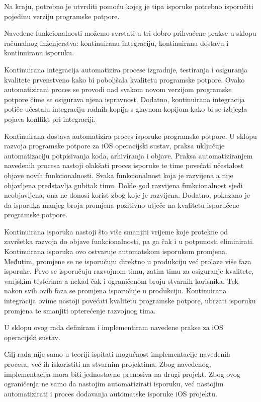 \documentclass[times, utf8, diplomski, numeric]{fer}
\begin{document}
Na kraju, potrebno je utvrditi pomoću kojeg je tipa isporuke potrebno isporučiti pojedinu verziju programske potpore.

Navedene funkcionalnosti možemo svrstati u tri dobro prihvaćene prakse u sklopu računalnog inženjerstva: kontinuiranu integraciju, kontinuiranu dostavu i kontinuiranu isporuku.

Kontinuirana integracija automatizira procese izgradnje, testiranja i osiguranja kvalitete prvenstveno kako bi poboljšala kvalitetu programske potpore. Ovako automatizirani proces se provodi nad svakom novom verzijom programske potpore čime se osigurava njena ispravnost. Dodatno, kontinuirana integracija potiče učestalu integraciju radnih kopija s glavnom kopijom kako bi se izbjegla pojava konflikt pri integraciji.

Kontinuirana dostava automatizira proces isporuke programske potpore. U sklopu razvoja programske potpore za iOS operacijski sustav, praksa uključuje automatizaciju potpisivanja koda, arhiviranja i objave. Praksa automatiziranjem navedenih procesa nastoji olakšati proces isporuke te time povećati učestalost objave novih funkcionalnosti. Svaka funkcionalnost koja je razvijena a nije objavljena predstavlja gubitak timu. Dokle god razvijena funkcionalnost sjedi neobjavljena, ona ne donosi korist zbog koje je razvijena. Dodatno, pokazano je da isporuka manjeg broja promjena pozitivno utječe na kvalitetu isporučene programske potpore.

Kontinuirana isporuka nastoji što više smanjiti vrijeme koje protekne od završetka razvoja do objave funkcionalnosti, pa ga čak i u potpunosti eliminirati. Kontinuirana isporuka ovo ostvaruje automatskom isporukom promjena. Međutim, promjene se ne isporučuju direktno u produkciju već prolaze više faza isporuke. Prvo se isporučuju razvojnom timu, zatim timu za osiguranje kvalitete, vanjskim testerima a nekad čak i ograničenom broju stvarnih korisnika. Tek nakon svih ovih faza se promjena isporučuje u produkciju. Kontinuirana integracija ovime nastoji povećati kvalitetu programske potpore, ubrzati isporuku promjena te smanjiti opterećenje razvojnog tima.

U sklopu ovog rada definiram i implementiram navedene prakse za iOS operacijski sustav.

Cilj rada nije samo u teoriji ispitati mogućnost implementacije navedenih procesa, već ih iskoristiti na stvarnim projektima. Zbog navedenog, implementacija mora biti jednostavno prenosiva na drugi projekt. Zbog ovog ograničenja ne samo da nastojim automatizirati isporuku, već nastojim automatizirati i proces dodavanja automatske isporuke iOS projektu.
\end{document}
